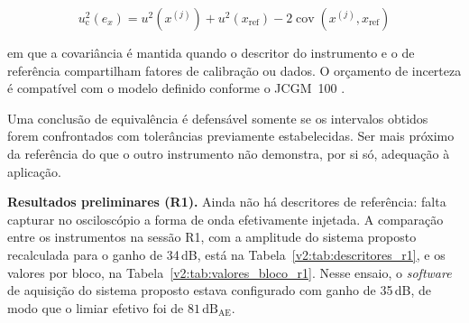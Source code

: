 \begin{equation}
	u_{\mathrm{c}}^2\left(e_x\right) = u^2\left(x^{(j)}\right) + u^2\left(x_{\mathrm{ref}}\right) - 2\operatorname{cov} \left(	x^{(j)}, x_{\mathrm{ref}}\right)
	\label{v2:eq:incerteza_erro_referencia}
\end{equation}

\noindent
em que a covariância é mantida quando o descritor do instrumento e o de referência compartilham fatores de calibração ou dados. O orçamento de incerteza é compatível com o modelo definido conforme o JCGM~100 \cite{jcgm2008}.

Uma conclusão de equivalência é defensável somente se os intervalos obtidos forem confrontados com tolerâncias previamente estabelecidas. Ser mais próximo da referência do que o outro instrumento não demonstra, por si só, adequação à aplicação.

\textbf{Resultados preliminares (R1).} Ainda não há descritores de referência: falta capturar no osciloscópio a forma de onda efetivamente injetada. A comparação entre os instrumentos na sessão R1, com a amplitude do sistema proposto recalculada para o ganho de 34\,dB, está na Tabela~\ref{v2:tab:descritores_r1}, e os valores por bloco, na Tabela~\ref{v2:tab:valores_bloco_r1}. Nesse ensaio, o \textit{software} de aquisição do sistema proposto estava configurado com ganho de 35\,dB, de modo que o limiar efetivo foi de \(81\,\mathrm{dB}_{\mathrm{AE}}\).

